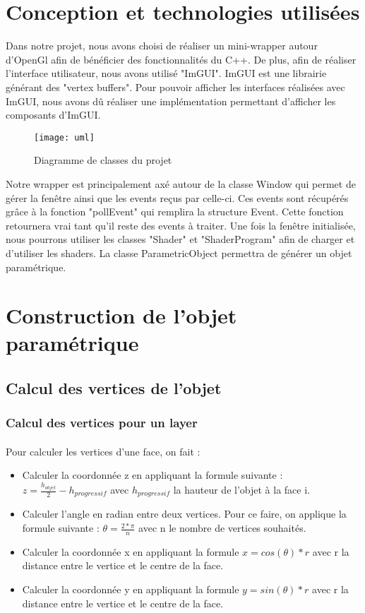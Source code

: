 \documentclass[article, backcover, french, nodocumentinfo]{upmethodology-document}
\begin{document}
	\section{Conception et technologies utilisées}
		Dans notre projet, nous avons choisi de réaliser un mini-wrapper autour d'OpenGl afin de bénéficier des fonctionnalités du C++.
		De plus, afin de réaliser l'interface utilisateur, nous avons utilisé "ImGUI". ImGUI est une librairie générant des "vertex buffers".
		Pour pouvoir afficher les interfaces réalisées avec ImGUI, nous avons dû réaliser une implémentation permettant d'afficher les composants d'ImGUI.

		\begin{figure}[H]
			\centering%
			\texttt{[image: uml]}
			\caption{Diagramme de classes du projet}
			\label{fig:uml}
		\end{figure}

		Notre wrapper est principalement axé autour de la classe Window qui permet de gérer la fenêtre ainsi que les events reçus par celle-ci.
		Ces events sont récupérés grâce à la fonction "pollEvent" qui remplira la structure Event. Cette fonction retournera vrai tant qu'il reste des events à traiter.
		Une fois la fenêtre initialisée, nous pourrons utiliser les classes "Shader" et "ShaderProgram" afin de charger et d'utiliser les shaders.
		La classe ParametricObject permettra de générer un objet paramétrique.
		
	\section{Construction de l'objet paramétrique}
	\subsection{Calcul des vertices de l'objet}
	\subsubsection{Calcul des vertices pour un layer}\label{a}
		\paragraph{} Pour calculer les vertices d'une face, on fait : 
		\begin{itemize}
			\item Calculer la coordonnée z en appliquant la formule suivante : $z = \frac{h_{objet}}{2} - h_{progressif}$ avec $h_{progressif}$ la hauteur de l'objet à la face i.
			\item Calculer l'angle en radian entre deux vertices. Pour ce faire, on applique la formule suivante : $\theta = \frac{2*\pi}{n}$ avec n le nombre de vertices souhaités.
			\item Calculer la coordonnée x en appliquant la formule $x = cos(\theta)*r$ avec r la distance entre le vertice et le centre de la face.
			\item Calculer la coordonnée y en appliquant la formule $y = sin(\theta)*r$ avec r la distance entre le vertice et le centre de la face.
		\end{itemize}
\end{document}
